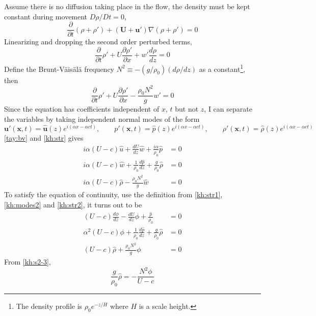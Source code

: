 Assume there is no diffusion taking place in the flow, the density
must be kept constant during movement $D\rho/Dt=0$,
\begin{equation*}
    \frac{\partial}{\partial
    t}(\rho+\rho')+(\mathbf{U}+\mathbf{u}')\nabla(\rho+\rho')=0
\end{equation*}
Linearizing and dropping the second order perturbed terms,
\begin{equation*}
    \frac{\partial}{\partial
    t}\rho'+U\frac{\partial\rho'}{\partial
    x}+w'\frac{d\rho}{dz}=0
\end{equation*}
Define the Brunt-V\"{a}is\"{a}l\"{a} frequency
$N^2\equiv-(g/\rho_0)(d\rho/dz)$ as a constant\footnote{The density
profile is $\rho_0e^{-z/H}$ where $H$ is a scale height.}, then
\begin{equation}\label{tay:bv}
    \frac{\partial}{\partial
    t}\rho'+U\frac{\partial\rho'}{\partial
    x}-\frac{\rho_0N^2}{g}w'=0
\end{equation}
Since the equation has coefficients independent of $x$, $t$ but not
$z$, I can separate the variables by taking independent normal modes
of the form
\begin{equation}\label{kh:modes3}
    \mathbf{u}'(\mathbf{x},t)=\hat{\mathbf{u}}(z)e^{i(\alpha x-\alpha c t)},\qquad
    p'(\mathbf{x},t)=\hat{p}(z)e^{i(\alpha x-\alpha c t)},\qquad
    \rho'(\mathbf{x},t)=\hat{\rho}(z)e^{i(\alpha x-\alpha c t)}
\end{equation}
\eqref{tay:bv} and \eqref{kh:str} gives
\begin{subequations}\label{kh:s1}
\begin{align}
i\alpha(U-c)\hat{u}+\frac{dU}{dz}\hat{w}+\frac{i\alpha}{\rho_0}\hat{p}&=0\label{kh:s1-1}\\
i\alpha(U-c)\hat{w}+\frac{1}{\rho_0}\frac{d\hat{p}}{dz}+\frac{g}{\rho_0}\hat{\rho}&=0\label{kh:s1-2}\\
i\alpha(U-c)\hat{\rho}-\frac{\rho_0N^2}{g}\hat{w}&=0\label{kh:s1-3}
\end{align}
\end{subequations}
To satisfy the equation of continuity, use the definition from
\eqref{kh:str1}, \eqref{kh:modes2} and \eqref{kh:str2}, it turns out
to be
\begin{subequations}\label{kh:s2}
\begin{align}
(U-c)\frac{d\phi}{dz}-\frac{dU}{dz}\phi+\frac{\hat{p}}{\rho_0}&=0\label{kh:s2-1}\\
\alpha^2(U-c)\phi+\frac{1}{\rho_0}\frac{d\hat{p}}{dz}+\frac{g}{\rho_0}\hat{\rho}&=0\label{kh:s2-2}\\
(U-c)\hat{\rho}+\frac{\rho_0N^2}{g}\phi&=0\label{kh:s2-3}
\end{align}
\end{subequations}
From \eqref{kh:s2-3},
\begin{equation}\label{kh:s3}
    \frac{g}{\rho_0}\hat{\rho}=-\frac{N^2\phi}{U-c}
\end{equation}

